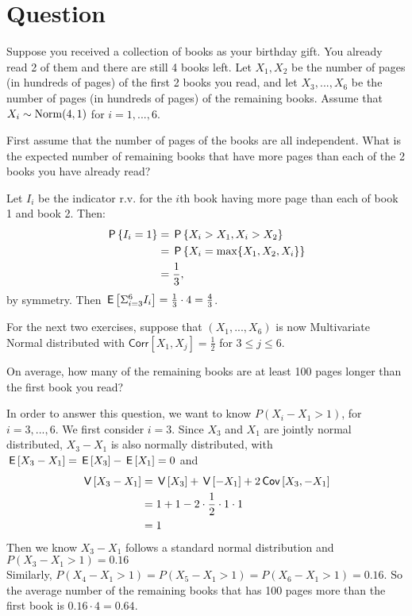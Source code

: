 \section*{Question}


Suppose you received a collection of books as your birthday gift. You already read 2 of them and there are still 4 books left. Let $X_1, X_2$ be the number of pages (in hundreds of pages) of the first 2 books you read, and let $X_3, ..., X_6$ be the number of pages (in hundreds of pages) of the remaining books. Assume that $X_i\sim \Norm{4, 1}$ for $i=1,...,6$. 


\begin{exercise}[1.5]
 First assume that the number of pages of the books are all independent. What is the expected number of remaining books that have more pages than each of the 2 books you have already read?
\begin{solution}
Let $I_i$ be the indicator r.v. for the $i$th book having more page than each of book 1 and book 2. Then:
    \begin{align*}
        \P{I_i=1}&=\P{X_i>X_1, X_i>X_2}\\
        &=\P{X_i = \max\{X_1, X_2, X_i\}} \\
        &=\frac13,
    \end{align*}
    by symmetry.
    Then $\E{\Sigma_{i=3}^{6}I_i}=\frac{1}{3}\cdot 4=\frac43$.
\end{solution}
\end{exercise}


For the next two exercises, suppose that $(X_1,...,X_6)$ is now Multivariate Normal distributed with $\mathsf{Corr}\left[X_1,X_j\right]=\frac{1}{2}$ for $3 \leq j\leq 6$.

\begin{exercise}[2.5]
 On average, how many of the remaining books are at least 100 pages longer than the first book you read? 
\begin{solution}
  In order to answer this question, we want to know $P(X_i-X_1>1)$, for $i=3,...,6$.
   We first consider $i=3$. Since $X_3$ and $X_1$ are jointly normal distributed, $X_3-X_1$ is also normally distributed, with $\E{X_3-X_1}=\E{X_3}-\E{X_1}=0$ and 
    \begin{align*}
        \V{X_3-X_1}&=\V{X_3}+\V{-X_1}+2\cov{X_3,-X_1}\\
        &=1+1-2\cdot\frac{1}{2}\cdot 1\cdot 1\\
        &=1
    \end{align*}
    Then we know $X_3-X_1$ follows a standard normal distribution and $P(X_3-X_1>1)=0.16$\\
    Similarly,  $P(X_4-X_1>1)=P(X_5-X_1>1)=P(X_6-X_1>1)=0.16$. So the average number of the remaining books that has 100 pages more than the first book is $0.16\cdot4=0.64.$
\end{solution}
\end{exercise}


